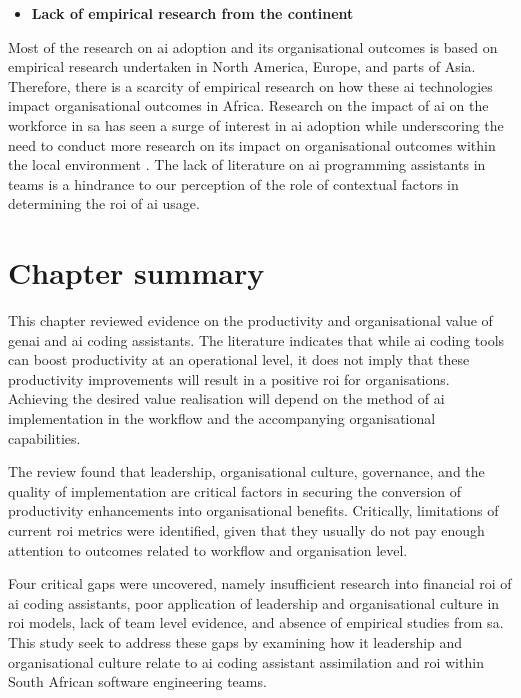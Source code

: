 \begin{itemize}
	\item \textbf{Lack of empirical research from the continent} 
\end{itemize}
Most of the research on \gls{ai} adoption and its organisational outcomes is based on empirical research undertaken in North America, Europe, and parts of Asia. Therefore, there is a scarcity of empirical research on how these \gls{ai} technologies impact organisational outcomes in Africa. Research on the impact of \gls{ai} on the workforce in \gls{sa} has seen a surge of interest in \gls{ai} adoption while underscoring the need to conduct more research on its impact on organisational outcomes within the local environment \autocite{Poisat2024}. The lack of literature on \gls{ai} programming assistants in teams is a hindrance to our perception of the role of contextual factors in determining the \gls{roi} of \gls{ai} usage.

\section {Chapter summary}
\label{sec:Chapter summary}
This chapter reviewed evidence on the productivity and organisational value of \gls{genai} and \gls{ai} coding assistants. The literature indicates that while \gls{ai} coding tools can boost productivity at an operational level, it does not imply that these productivity improvements will result in a positive \gls{roi} for organisations. Achieving the desired value realisation will depend on the method of \gls{ai} implementation in the workflow and the accompanying organisational capabilities.

The review found that leadership, organisational culture, governance, and the quality of implementation are critical factors in securing the conversion of productivity enhancements into organisational benefits. Critically, limitations of current \gls{roi} metrics were identified, given that they usually do not pay enough attention to outcomes related to workflow and organisation level.

Four critical gaps were uncovered, namely insufficient research into financial \gls{roi} of \gls{ai} coding assistants, poor application of leadership and organisational culture in \gls{roi} models, lack of team level evidence, and absence of empirical studies from \gls{sa}. This study seek to address these gaps by examining how \gls{it} leadership and organisational culture relate to \gls{ai} coding assistant assimilation and \gls{roi} within South African software engineering teams.